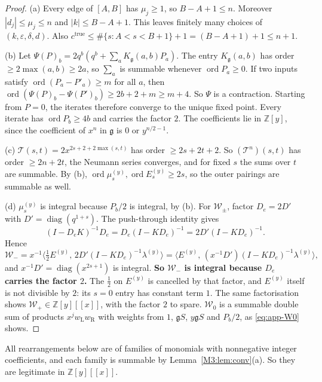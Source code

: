 \documentclass[11pt]{article}
\theoremstyle{plain}
\theoremstyle{definition}
\theoremstyle{remark}
\begin{document}
\begin{proof}
(a) Every edge of $[A,B]$ has $\mu_j\ge1$, so $B-A+1\le n$. Moreover $|d_j|\le\mu_j\le n$
and $|k|\le B-A+1$. This leaves finitely many choices of $(k,\varepsilon,\delta,d)$. Also
$c^{\mathrm{true}}\le\#\{s:A<s<B+1\}+1=(B-A+1)+1\le n+1$.

(b) Let $\Psi(P)_b=2q^b(q^b+\sum_aK_{\mathfrak g}(a,b)P_a)$. The entry $K_{\mathfrak g}(a,b)$
has order $\ge2\max(a,b)\ge 2a$, so $\sum_a$ is summable whenever $\operatorname{ord}P_a\ge0$.
If two inputs satisfy $\operatorname{ord}(P_a-P'_a)\ge m$ for all $a$, then
$\operatorname{ord}(\Psi(P)_b-\Psi(P')_b)\ge 2b+2+m\ge m+4$. So $\Psi$ is a contraction.
Starting from $P=0$, the iterates therefore converge to the unique fixed point. Every
iterate has $\operatorname{ord}P_b\ge4b$ and carries the factor $2$. The coefficients lie
in $\mathbb Z[y]$, since the coefficient of $x^n$ in $\mathfrak g$ is $0$ or $y^{n/2-1}$.

(c) $\mathcal T(s,t)=2x^{2s+2+2\max(s,t)}$ has order $\ge 2s+2t+2$. So $(\mathcal T^n)(s,t)$
has order $\ge 2n+2t$, the Neumann series converges, and for fixed $s$ the sums over $t$ are
summable. By (b), $\operatorname{ord}\mu^{(y)}_s,\operatorname{ord}E^{(y)}_s\ge 2s$, so the
outer pairings are summable as well.

(d) $\mu^{(y)}_s$ is integral because $P_b/2$ is integral, by (b). For $\mathcal W_\pm$,
factor $D_e=2D'$ with $D'=\operatorname{diag}(q^{1+s})$. The push-through identity gives
\[
  (I-D_eK)^{-1}D_e=D_e(I-KD_e)^{-1}=2D'(I-KD_e)^{-1}.
\]
Hence
\[
  \mathcal W_-=x^{-1}\bigl\langle\tfrac12E^{(y)},\,2D'(I-KD_e)^{-1}\lambda^{(y)}\bigr\rangle
  =\bigl\langle E^{(y)},\,(x^{-1}D')(I-KD_e)^{-1}\lambda^{(y)}\bigr\rangle ,
\]
and $x^{-1}D'=\operatorname{diag}(x^{2s+1})$ is integral. \textbf{So $\mathcal W_-$ is
integral because $D_e$ carries the factor $2$.} The $\tfrac12$ on $E^{(y)}$ is cancelled by
that factor, and $E^{(y)}$ itself is not divisible by $2$: its $s=0$ entry has constant
term $1$. The same factorisation shows $\mathcal W_+\in\mathbb Z[y][[x]]$, with the factor
$2$ to spare. $\mathcal W_0$ is a summable double sum of products $x^jw_{\mathrm L}w_{\mathrm R}$
with weights from $1$, $\mathfrak gS$, $y\mathfrak gS$ and $P_b/2$, as \eqref{eq:app-W0} shows.
\end{proof}

All rearrangements below are of families of monomials with nonnegative integer coefficients,
and each family is summable by Lemma~\ref{M3:lem:conv}(a). So they are legitimate in
$\mathbb Z[y][[x]]$.
\end{document}
